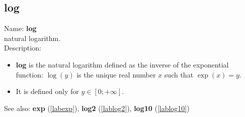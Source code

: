 \subsection{log}
\label{lablog}
\noindent Name: \textbf{log}\\
natural logarithm.\\

\noindent Description: \begin{itemize}

\item \textbf{log} is the natural logarithm defined as the inverse of the exponential
   function: $\log(y)$ is the unique real number $x$ such that $\exp(x)=y$.

\item It is defined only for $y \in [0; +\infty]$.
\end{itemize}
See also: \textbf{exp} (\ref{labexp}), \textbf{log2} (\ref{lablog2}), \textbf{log10} (\ref{lablog10})
